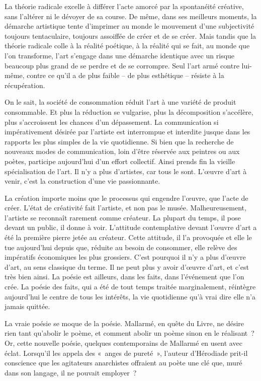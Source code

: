 \documentclass[french,twoside]{book} %
\begin{document}
La théorie radicale excelle à différer l’acte amorcé par la spontanéité créative, sans l’altérer ni le dévoyer de sa course. De même, dans ses meilleurs moments, la démarche artistique tente d’imprimer au monde le mouvement d’une subjectivité toujours tentaculaire, toujours assoiffée de créer et de se créer. Mais tandis que la théorie radicale colle à la réalité poétique, à la réalité qui se fait, au monde que l’on transforme, l’art s’engage dans une démarche identique avec un risque beaucoup plus grand de se perdre et de se corrompre. Seul l’art armé contre lui-même, contre ce qu’il a de plus faible – de plus esthétique – résiste à la récupération.\par
On le sait, la société de consommation réduit l’art à une variété de produit consommable. Et plus la réduction se vulgarise, plus la décomposition s’accélère, plus s’accroissent les chances d’un dépassement. La communication si impérativement désirée par l’artiste est interrompue et interdite jusque dans les rapports les plus simples de la vie quotidienne. Si bien que la recherche de nouveaux modes de communication, loin d’être réservée aux peintres ou aux poètes, participe aujourd’hui d’un effort collectif. Ainsi prends fin la vieille spécialisation de l’art. Il n’y a plus d’artistes, car tous le sont. L’œuvre d’art à venir, c’est la construction d’une vie passionnante.\par
La création importe moins que le processus qui engendre l’œuvre, que l’acte de créer. L’état de créativité fait l’artiste, et non pas le musée. Malheureusement, l’artiste se reconnaît rarement comme créateur. La plupart du temps, il pose devant un public, il donne à voir. L’attitude contemplative devant l’œuvre d’art a été la première pierre jetée au créateur. Cette attitude, il l’a provoquée et elle le tue aujourd’hui depuis que, réduite au besoin de consommer, elle relève des impératifs économiques les plus grossiers. C’est pourquoi il n’y a plus d’œuvre d’art, au sens classique du terme. Il ne peut plus y avoir d’œuvre d’art, et c’est très bien ainsi. La poésie est ailleurs, dans les faits, dans l’événement que l’on crée. La poésie des faits, qui a été de tout temps traitée marginalement, réintègre aujourd’hui le centre de tous les intérêts, la vie quotidienne qu’à vrai dire elle n’a jamais quittée.\par
La vraie poésie se moque de la poésie. Mallarmé, en quête du Livre, ne désire rien tant qu’abolir le poème, et comment abolir un poème sinon en le réalisant ? Or, cette nouvelle poésie, quelques contemporains de Mallarmé en usent avec éclat. Lorsqu’il les appela des « anges de pureté », l’auteur d’Hérodiade prit-il conscience que les agitateurs anarchistes offraient au poète une clé que, muré dans son langage, il ne pouvait employer ?\par
\end{document}
